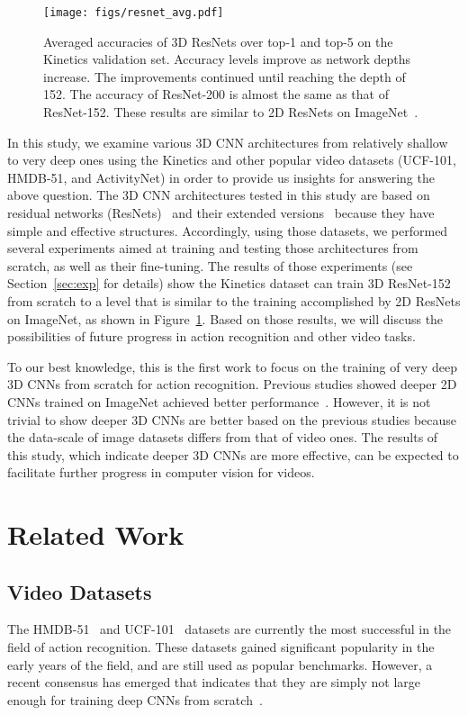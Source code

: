 \documentclass[10pt,twocolumn,letterpaper]{article}
\begin{document}
  \begin{figure}[t]
    \centering
    \texttt{[image: figs/resnet\_avg.pdf]}
    \caption{
      Averaged accuracies of 3D ResNets over top-1 and top-5 on the Kinetics validation set.
      Accuracy levels improve as network depths increase.
      The improvements continued until reaching the depth of 152.
      The accuracy of ResNet-200 is almost the same as that of ResNet-152.
      These results are similar to 2D ResNets on ImageNet~\cite{ResNet}.
    }\label{fig:resnet_depth}
  \end{figure}
  In this study, we examine various 3D CNN architectures from relatively shallow to very deep ones
  using the Kinetics and other popular video datasets (UCF-101, HMDB-51, and ActivityNet) in order to provide us insights for answering the above question.
  The 3D CNN architectures tested in this study are based on residual networks (ResNets)~\cite{ResNet} and their extended versions~\cite{He2016,densenets,resnext,WideResNet}
  because they have simple and effective structures.
  Accordingly, using those datasets, we performed several experiments
  aimed at training and testing those architectures from scratch, as well as their fine-tuning.
  The results of those experiments (see Section~\ref{sec:exp} for details) show the Kinetics dataset can train 3D ResNet-152 from scratch
  to a level that is similar to the training accomplished by 2D ResNets on ImageNet, as shown in Figure~\ref{fig:resnet_depth}.
  Based on those results, we will discuss the possibilities of future progress in action recognition and other video tasks.
  
  To our best knowledge, this is the first work to focus on the training of very deep 3D CNNs from scratch for action recognition.
  Previous studies showed deeper 2D CNNs trained on ImageNet achieved better performance~\cite{ResNet}.
  However, it is not trivial to show deeper 3D CNNs are better based on the previous studies
  because the data-scale of image datasets differs from that of video ones.
  The results of this study, which indicate deeper 3D CNNs are more effective,
  can be expected to facilitate further progress in computer vision for videos.

\section{Related Work}
  \subsection{Video Datasets}
    The HMDB-51~\cite{HMDB51} and UCF-101~\cite{UCF101} datasets are currently the most successful in the field of action recognition.
    These datasets gained significant popularity in the early years of the field, and are still used as popular benchmarks.
    However, a recent consensus has emerged that indicates that they are simply not large enough for training deep CNNs from scratch~\cite{Kinetics}.
\end{document}
